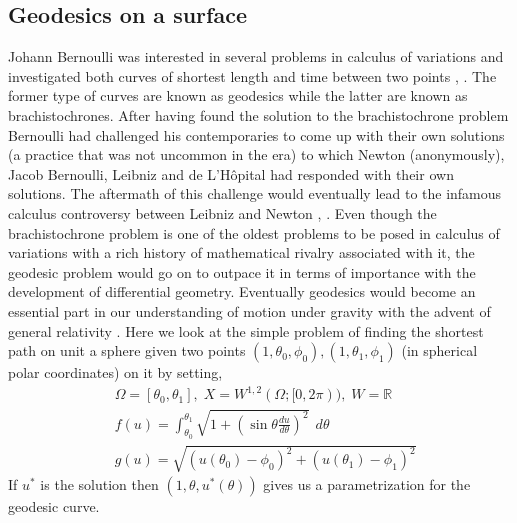 \subsection{Geodesics on a surface}  Johann Bernoulli was interested in several problems in calculus of variations and investigated both curves of shortest length and time between two points \cite{struik1961lectures}, \cite{goldstine2012history}. The former type of curves are known as geodesics while the latter are known as brachistochrones. After having found the solution to the brachistochrone problem Bernoulli had challenged his contemporaries to come up with their own solutions (a practice that was not uncommon in the era) to which Newton (anonymously), Jacob Bernoulli, Leibniz and de L'Hôpital had responded with their own solutions. The aftermath of this challenge would eventually lead to the infamous calculus controversy between Leibniz and Newton \cite{palomo2021new}, \cite{goldstine2012history}. Even though the brachistochrone problem is one of the oldest problems to be posed in calculus of variations with a rich history of mathematical rivalry associated with it, the geodesic problem would go on to outpace it in terms of importance with the development of differential geometry. Eventually geodesics would become an essential part in our understanding of motion under gravity with the advent of general relativity \cite{weinberg1972gravitation}. Here we look at the simple problem of finding the shortest path on unit a sphere given two points $(1, \theta_0, \phi_0), (1, \theta_1, \phi_1)$ (in spherical polar coordinates) on it by setting,
\begin{equation}
\begin{aligned}
    &\Omega=[\theta_0, \theta_1],\;X=W^{1, 2}(\Omega; [0, 2\pi)),\; W=\mathbb R\\
    &f(u) = \int_{\theta_0}^{\theta_1}\sqrt{1+\left(\sin\theta \frac{du}{d\theta}\right)^2}\;\,d\theta\\
    & g(u) = \sqrt{(u(\theta_0)-\phi_0)^2 + (u(\theta_1)-\phi_1)^2}\label{eq:gs--var-ml}
\end{aligned}
\end{equation}
If $u^*$ is the solution then $(1,\theta, u^*(\theta))$ gives us a parametrization for the geodesic curve.
